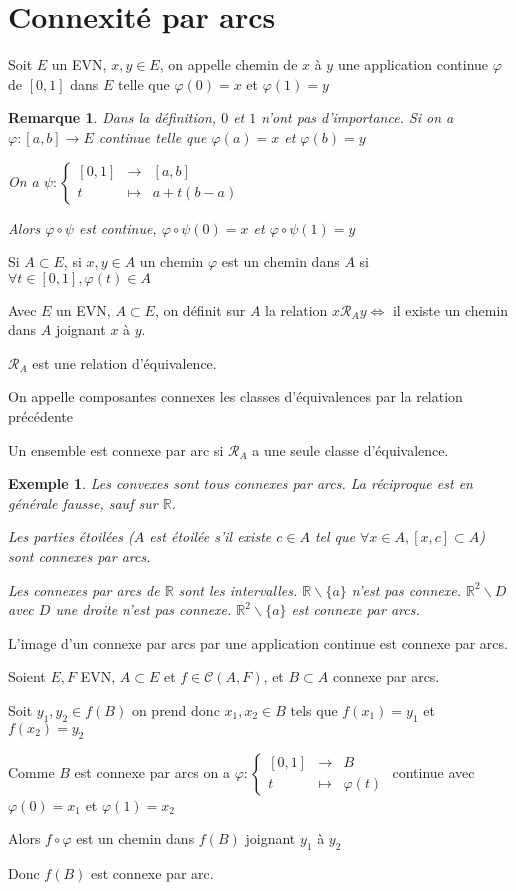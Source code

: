 \documentclass[a4paper,12pt]{book}
\newcommand{\Def}[2]{\begin{tcolorbox}[sharp corners, colback=white,colframe=blue!90!black!75, title=Définition : #1]#2\end{tcolorbox}}
\newcommand{\Thr}[2]{\begin{tcolorbox}[sharp corners, colback=white,colframe=red!90!black!75, title=Théorème : #1]#2\end{tcolorbox}}
\newcommand{\Prop}[2]{\begin{tcolorbox}[sharp corners, colback=white,colframe=red!90!black!75, title=Proposition : #1]#2\end{tcolorbox}}
\newcommand{\Pre}[1]{\begin{tcolorbox}[sharp corners, colback=white,colframe=green!60!green!30!black!75, title=Preuve]#1\end{tcolorbox}}
\newtheorem{Exe}{Exemple}[section]
\newtheorem{Rem}{Remarque}[section]
\def\R{\mathbb{R}}
\begin{document}
\section{Connexité par arcs}
\Def{Chemin}{Soit $E$ un EVN, $x,y\in E$, on appelle chemin de $x$ à $y$ une application continue $\varphi$ de $[0,1]$ dans $E$ telle que $\varphi(0)=x$ et $\varphi(1)=y$}
\begin{Rem}
Dans la définition, $0$ et $1$ n'ont pas d'importance. Si on a $\varphi:[a,b]\to E$ continue telle que $\varphi(a)=x$ et $\varphi(b)=y$ \par On a $\psi :\left\{\begin{array}{rcl} [0,1] & \to & [a,b] \\ t & \mapsto & a+t(b-a)\end{array}\right.$ \par Alors $\varphi\circ\psi$ est continue, $\varphi\circ\psi(0)=x$ et $\varphi\circ\psi(1)=y$
\end{Rem}
\Def{Chemin dans une partie}{Si $A\subset E$, si $x,y\in A$ un chemin $\varphi$ est un chemin dans $A$ si $\forall t\in [0,1],\varphi(t)\in A$}
\Prop{Relation d'équivalence}{Avec $E$ un EVN, $A\subset E$, on définit sur $A$ la relation $x\mathcal{R}_Ay \Leftrightarrow$ il existe un chemin dans $A$ joignant $x$ à $y$. \par $\mathcal{R}_A$ est une relation d'équivalence.}
\Def{Connexes}{On appelle composantes connexes les classes d'équivalences par la relation précédente \par Un ensemble est connexe par arc si $\mathcal{R}_A$ a une seule classe d'équivalence.}
\begin{Exe}
Les convexes sont tous connexes par arcs. La réciproque est en générale fausse, sauf sur $\R$. \par Les parties étoilées ($A$ est étoilée s'il existe $c\in A$ tel que $\forall x\in A, [x,c]\subset A$) sont connexes par arcs. \par Les connexes par arcs de $\R$ sont les intervalles. $\R\backslash \{a\}$ n'est pas connexe. $\R^2\backslash D$ avec $D$ une droite n'est pas connexe. $\R^2\backslash \{a\}$ est connexe par arcs. 
\end{Exe}
\Thr{Valeurs intermédiaires}{L'image d'un connexe par arcs par une application continue est connexe par arcs.}
\Pre{Soient $E,F$ EVN, $A\subset E$ et $f\in\mathcal{C}(A,F)$, et $B\subset A$ connexe par arcs. \par Soit $y_1, y_2\in f(B)$ on prend donc $x_1, x_2\in B$ tels que $f(x_1)=y_1$ et $f(x_2)=y_2$ \par Comme $B$ est connexe par arcs on a $\varphi : \left\{\begin{array}{rcl} [0,1] & \to & B \\ t & \mapsto & \varphi(t) \end{array}\right.$ continue avec $\varphi(0)=x_1$ et $\varphi(1)=x_2$ \par Alors $f\circ\varphi$ est un chemin dans $f(B)$ joignant $y_1$ à $y_2$ \par Donc $f(B)$ est connexe par arc.}
\end{document}
